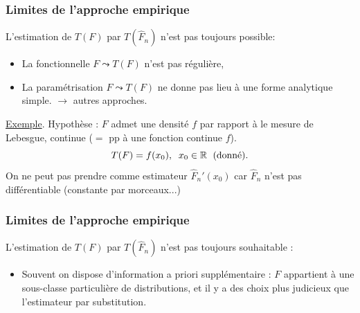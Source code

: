 \begin{frame}
\frametitle{Limites de l'approche empirique} L'estimation de $T(F)$
par $T(\widehat F_n)$ n'est pas toujours \alert{possible}:
%
%
\begin{itemize}
\item La fonctionnelle $F \leadsto T(F)$ n'est pas \og régulière\fg{},
\item La paramétrisation $F \leadsto T(F)$ ne donne \alert{pas} lieu à une \alert{forme analytique simple}.
$\rightarrow$ autres approches.
\end{itemize}
%
\underline{Exemple}. \alert{Hypothèse} : $F$ admet une densité
$f$ par rapport à le mesure de Lebesgue, \alert{continue} ($=$
pp à une fonction continue $f$).
$$T(F) = f(x_0),\;\;x_0\in \operatorname{{\mathbb R}} \,\;\text{(donné)}.$$
On ne \alert{peut pas prendre} comme estimateur $\widehat
F_n'(x_0)$ car $\widehat F_n$ n'est pas diff\'erentiable (constante
par morceaux...)

\end{frame}

\begin{frame}
\frametitle{Limites de l'approche empirique} L'estimation de $T(F)$
par $T(\widehat F_n)$ n'est pas toujours \alert{souhaitable} :
\begin{itemize}
\item
Souvent on dispose d'information \alert{a priori}
supplémentaire : $F$ appartient à une sous-classe \alert{
particulière} de distributions, et il y a des choix plus judicieux
que l'estimateur par substitution.
\end{itemize}
\end{frame}


